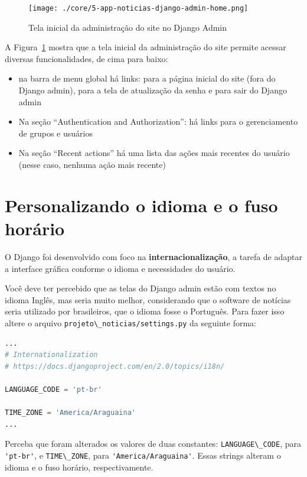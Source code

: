 \documentclass[brazil,a4paper,oneside,openright,parskip=full]{book}
\newcommand{\passthrough}[1]{#1}
\providecommand{\tightlist}{%
  \setlength{\itemsep}{0pt}\setlength{\parskip}{0pt}}
\begin{document}
\begin{figure}
\hypertarget{fig:5-app-noticias-django-admin-home}{%
\centering
\texttt{[image: ./core/5-app-noticias-django-admin-home.png]}
\caption{Tela inicial da administração do site no Django
Admin}\label{fig:5-app-noticias-django-admin-home}
}
\end{figure}

A Figura~\ref{fig:5-app-noticias-django-admin-home} mostra que a tela
inicial da administração do site permite acessar diversas
funcionalidades, de cima para baixo:

\begin{itemize}
\tightlist
\item
  na barra de menu global há links: para a página inicial do site (fora
  do Django admin), para a tela de atualização da senha e para sair do
  Django admin
\item
  Na seção ``Authentication and Authorization'': há links para o
  gerenciamento de grupos e usuários
\item
  Na seção ``Recent actions'' há uma lista das ações mais recentes do
  usuário (nesse caso, nenhuma ação mais recente)
\end{itemize}

\hypertarget{personalizando-o-idioma-e-o-fuso-horuxe1rio}{%
\section{Personalizando o idioma e o fuso
horário}\label{personalizando-o-idioma-e-o-fuso-horuxe1rio}}

O Django foi desenvolvido com foco na \textbf{internacionalização}, a
tarefa de adaptar a interface gráfica conforme o idioma e necessidades
do usuário.

Você deve ter percebido que as telas do Django admin estão com textos no
idioma Inglês, mas seria muito melhor, considerando que o software de
notícias seria utilizado por brasileiros, que o idioma fosse o
Português. Para fazer isso altere o arquivo
\passthrough{\lstinline!projeto\_noticias/settings.py!} da seguinte
forma:

\begin{lstlisting}[language=Python]
...
# Internationalization
# https://docs.djangoproject.com/en/2.0/topics/i18n/

LANGUAGE_CODE = 'pt-br'

TIME_ZONE = 'America/Araguaina'
...
\end{lstlisting}

Perceba que foram alterados os valores de duas constantes:
\passthrough{\lstinline!LANGUAGE\_CODE!}, para
\passthrough{\lstinline!'pt-br'!}, e
\passthrough{\lstinline!TIME\_ZONE!}, para
\passthrough{\lstinline!'America/Araguaina'!}. Essas strings alteram o
idioma e o fuso horário, respectivamente.
\end{document}
